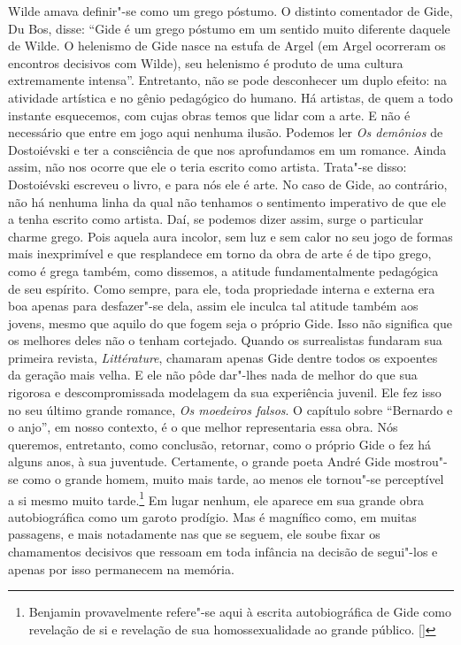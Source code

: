 Wilde amava definir"-se como um grego póstumo. O distinto comentador de
Gide, Du Bos, disse: ``Gide é um grego póstumo em um sentido muito
diferente daquele de Wilde. O helenismo de Gide nasce na estufa de Argel
(em Argel ocorreram os encontros decisivos com Wilde), seu helenismo é
produto de uma cultura extremamente intensa''. Entretanto, não se pode
desconhecer um duplo efeito: na atividade artística e no gênio pedagógico
do humano. Há artistas, de quem a todo instante esquecemos, com cujas obras temos que lidar com a arte. E não é necessário que entre em jogo
aqui nenhuma ilusão. Podemos ler \emph{Os demônios} de Dostoiévski e ter
a consciência de que nos aprofundamos em um romance. Ainda assim, não
nos ocorre que ele o teria escrito como artista. Trata"-se disso:
Dostoiévski escreveu o livro, e para nós ele é arte. No caso de Gide, ao
contrário, não há nenhuma linha da qual não tenhamos o sentimento
imperativo de que ele a tenha escrito como artista. Daí, se podemos dizer
assim, surge o particular charme grego. Pois aquela aura incolor, sem luz e sem
calor no seu jogo de formas mais inexprimível e que resplandece em torno da
obra de arte é de tipo grego, como é grega também, como dissemos, a atitude
fundamentalmente pedagógica de seu espírito. Como sempre, para ele, toda
propriedade interna e externa era boa apenas para desfazer"-se dela,
assim ele inculca tal atitude também aos jovens, mesmo que aquilo do que
fogem seja o próprio Gide. Isso não significa que os melhores deles não o
tenham cortejado. Quando os surrealistas fundaram sua primeira revista,
\emph{Littérature}, chamaram apenas Gide dentre todos os expoentes
da geração mais velha. E ele não pôde dar"-lhes nada de melhor do que sua
rigorosa e descompromissada modelagem da sua experiência juvenil. Ele fez isso
no seu último grande romance, \emph{Os moedeiros falsos}. O
capítulo sobre ``Bernardo e o anjo'', em nosso contexto, é o que melhor
representaria essa obra. Nós queremos, entretanto, como conclusão,
retornar, como o próprio Gide o fez há alguns anos, à sua juventude.
Certamente, o grande poeta André Gide mostrou"-se como o grande homem,
muito mais tarde, ao menos ele tornou"-se perceptível a si mesmo muito
tarde.\footnote{Benjamin provavelmente refere"-se aqui à escrita autobiográfica de Gide como revelação de si e revelação de sua homossexualidade ao grande público. []} Em lugar nenhum, ele aparece em sua grande obra autobiográfica
como um garoto prodígio. Mas é magnífico como, em muitas passagens,
e mais notadamente nas que se seguem, ele soube fixar os chamamentos
decisivos que ressoam em toda infância na decisão de segui"-los e
apenas por isso permanecem na memória.

